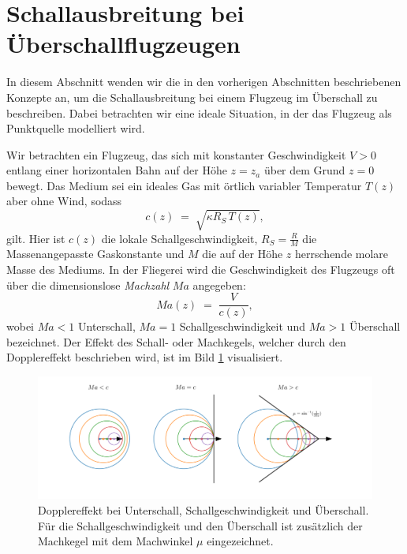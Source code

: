 %
%
%
%
\section{Schallausbreitung bei Überschallflugzeugen
\label{schall:section:teil3}}

In diesem Abschnitt wenden wir die in den vorherigen Abschnitten
beschriebenen Konzepte an, um die Schallausbreitung bei einem
Flugzeug im Überschall zu beschreiben.
Dabei betrachten wir eine ideale Situation, in der das Flugzeug als
Punktquelle modelliert wird.

Wir betrachten ein Flugzeug, das sich mit konstanter Geschwindigkeit
$V>0$ entlang einer horizontalen Bahn auf der Höhe $z=z_a$ über
dem Grund $z=0$ bewegt.
Das Medium sei ein ideales Gas mit örtlich variabler Temperatur
$T(z)$ aber ohne Wind, sodass
\begin{equation}
    c(z) \;=\; \sqrt{\kappa R_S\,T(z)} ,
    \label{eq:c-of-z}
\end{equation}
gilt. Hier ist $c(z)$ die lokale Schallgeschwindigkeit, $R_S = \frac{R}{M}$
die Massenangepasste Gaskonstante und $M$ die auf der Höhe $z$ herrschende
molare Masse des Mediums.
In der Fliegerei wird die Geschwindigkeit des Flugzeugs oft über die
dimensionslose \emph{Machzahl} $Ma$ angegeben:
\begin{equation}
    Ma(z) \;=\; \frac{V}{c(z)},
    \label{eq:mach-number}
\end{equation}
wobei $Ma<1$ Unterschall, $Ma=1$ Schallgeschwindigkeit und $Ma>1$ Überschall
bezeichnet.
Der Effekt des Schall- oder Machkegels, welcher durch den Dopplereffekt
beschrieben wird, ist im Bild \ref{fig:schall:mach-zones} visualisiert.

\begin{figure}
    \centering
    \includegraphics[width=\textwidth]{papers/schall/figures/mach_doppler_triptych_offsets.png}
    \caption{Dopplereffekt bei Unterschall, Schallgeschwindigkeit und Überschall.
    Für die Schallgeschwindigkeit und den Überschall ist zusätzlich der
    Machkegel mit dem Machwinkel $\mu$ eingezeichnet.}
    \label{fig:schall:mach-zones}
\end{figure}

